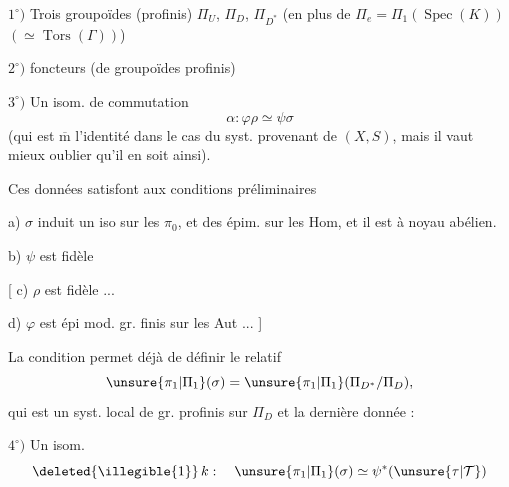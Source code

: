 


$1^\circ)$ Trois groupoïdes (profinis) $\Pi_U$, $\Pi_D$, $\Pi_{D^*}$
(en plus de $\Pi_e=\Pi_1(\operatorname{Spec}(K))$
$(\simeq\operatorname{Tors}(\Gamma))$)

$2^\circ)$   foncteurs
(de groupoïdes profinis)

$3^\circ)$ Un isom. de commutation
\[
\alpha:\varphi\rho\simeq\psi\sigma
\]
(qui est $\overline{\mathrm m}$ l'identité dans le cas du syst. provenant de $(X,S)$,
mais  il vaut mieux oublier qu'il en soit ainsi).

Ces données satisfont aux conditions 
préliminaires

a) $\sigma$ induit un iso sur les $\pi_0$, et des épim. sur les Hom,
et il est à noyau abélien.

b) $\psi$ est fidèle

[ c) $\rho$ est fidèle ...

d) $\varphi$ est épi mod. gr. finis sur les Aut ... ]


La condition  permet déjà de définir le
 relatif
\[
\unsure{\pi_1|\Pi_1}(\sigma)
 = \unsure{\pi_1|\Pi_1}(\Pi_{D^*}/\Pi_D),
\]
qui est un syst. local de gr. profinis sur $\Pi_D$
et la dernière donnée :

$4^\circ)$ Un isom. 
\[
\deleted{\illegible{1}}\,k:\quad
\unsure{\pi_1|\Pi_1}(\sigma)\simeq
\psi^*(\unsure{\tau|\mathcal T})
\]

